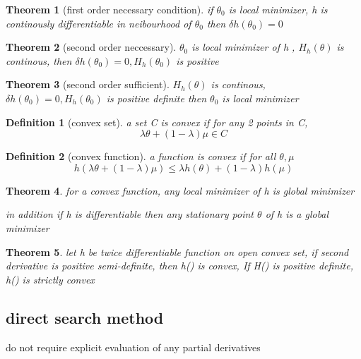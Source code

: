 \documentclass[10pt]{article}
\theoremstyle{break}
\newtheorem{thm}{Theorem}[subsection]
\newtheorem{defn}{Definition}[subsection]
\begin{document}
            \begin{thm}[first order necessary condition]
                if $\theta_0$ is local minimizer, h is continously differentiable in 
                neibourhood of $\theta_0$ then $\delta h(\theta_0)=0$
            \end{thm}

            \begin{thm}[second order neccessary]
                $\theta_0$ is local minimizer of h , $H_h(\theta)$ is continous,
                then $\delta h(\theta_0)=0, H_h(\theta_0)$ is positive
            \end{thm}

            \begin{thm}[second order sufficient]
                $H_h(\theta)$ is continous,$\delta h(\theta_0)=0, H_h(\theta_0)$ is positive definite
                then  $\theta_0$ is local minimizer
            \end{thm}

            \begin{defn}[convex set]
                a set C is convex if for any 2 points in C, 
                $$\lambda \theta + (1-\lambda)\mu \in C$$
            \end{defn}

            \begin{defn}[convex function]
                a function is convex if for all $\theta, \mu$
                $$h(\lambda \theta + (1-\lambda)\mu) \leq \lambda h(\theta)+(1-\lambda)h(\mu)$$
            \end{defn}

            \begin{thm}
                for a convex function, any local minimizer of h is global minimizer 

                in addition if h is differentiable then any stationary point $\theta$ of h is a global minimizer
            \end{thm}

            \begin{thm}
                let h be twice differentiable function on open convex set, if second derivative is positive semi-definite, 
                then h() is convex, If H() is positive definite, h() is strictly convex
            \end{thm}

            \subsection{direct search method}
                do not require explicit evaluation of any partial derivatives 
\end{document}
